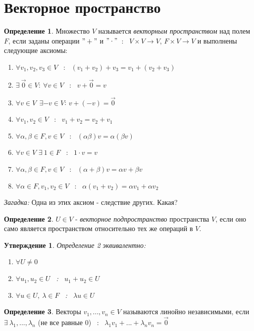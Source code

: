 \documentclass[a4paper, 12pt]{article}
\theoremstyle{definition}
\newtheorem{definition}{Определение}
\theoremstyle{plain}
\newtheorem*{subtheorem}{Утверждение}
\theoremstyle{remark}
\begin{document}
  \section{Векторное пространство}
  \begin{definition}
    Множество $V$ называется \textit{векторным пространством} над полем $F$, если заданы операции $"+"$ и $"\cdot"$\ : \ $V\times V \to V$, $F \times V \to V$ и выполнены следующие аксиомы:
    \begin{enumerate}
        \item $\forall v_1, v_2, v_3\in V$ \ : \ $(v_1 + v_2) + v_3 = v_1 + (v_2 + v_3)$
        \item $\exists \ \vec 0 \in V:\ \forall v \in V$ \ : \ $v + \vec 0 = v$
        \item $\forall v \in V \ \ \exists  -v  \in V$: $v + (-v) = \vec 0$
        \item $\forall v_1, v_2 \in V$ \ : \ $v_1 + v_2 = v_2 + v_1$
        \item $\forall \alpha, \beta \in F, v \in V$ \ : \ $(\alpha \beta)v = \alpha (\beta v)$
        \item $\forall v \in V$ $\exists \ 1 \in F$ \ : \ $1 \cdot v = v$
        \item $\forall \alpha, \beta \in F, v \in V$ \ : \ $(\alpha + \beta)v = \alpha v + \beta v$
        \item $\forall \alpha \in F, v_1, v_2 \in V$ \ : \ $\alpha (v_1 + v_2) = \alpha v_1 + \alpha v_2$
    \end{enumerate}
    \textit{Загадка:} Одна из этих аксиом - следствие других. Какая?
  \end{definition}
  \begin{definition}
    $U \in V$ - \textit{векторное подпространство} пространства $V$, если оно само является пространством относительно тех же операций в $V$. 
  \end{definition}
  \begin{subtheorem}
    Определение 2 эквивалентно:
    \begin{enumerate}
      \item $\forall U\neq 0$
      \item $\forall u_1, u_2 \in U$ \ : \  $u_1 + u_2 \in U$
      \item $\forall u \in U, \ \lambda \in F$ \ : \ $\lambda u\in U$
    \end{enumerate}
  \end{subtheorem} 
  \begin{definition}
    Векторы $v_1,...,v_n \in V$ называются линойно независимыми, если $\exists \ \lambda_1,..., \lambda_n$ (не все равные 0) \ : \ $\lambda_1v_1+...+\lambda_nv_n = \vec 0$
  \end{definition} 
\end{document}
